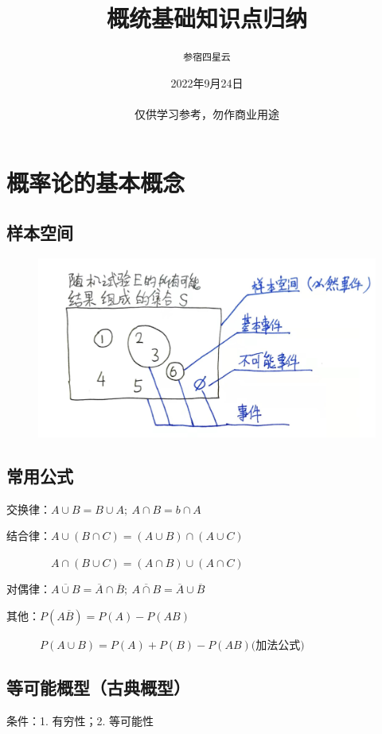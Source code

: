 \documentclass[UTF8]{ctexart}
\title{\zihao{-1}\bf 概统基础知识点归纳}
\author{\tt 参宿四星云}
\date{2022年9月24日\\ \ \\\kaishu 仅供学习参考，勿作商业用途}
\begin{document}
\everymath{\displaystyle}
\maketitle
\tableofcontents
\newpage
{}
\section{概率论的基本概念}
\subsection{样本空间}
\begin{figure}[H]
    \centering
    \includegraphics[scale=0.24]{样本空间.jpg}
\end{figure}

\subsection{常用公式}


交换律：$A\cup B =B\cup A;\ A\cap B=b\cap A$

结合律：$A\cup(B\cap C)=(A\cup B)\cap(A\cup C)$

$\qquad\qquad A\cap(B\cup C)=(A\cap B)\cup(A\cap C)$

对偶律：$\overline{A\cup B}=\overline A\cap\overline B;\ \overline{A\cap B}=\overline A\cup\overline B$

其他：$P(A\overline B)=P(A)-P(AB)$

$\qquad\quad P(A\cup B)=P(A)+P(B)-P(AB)\text{(加法公式)}$


\subsection{等可能概型（古典概型）}

条件：1. 有穷性；2. 等可能性
\end{document}
